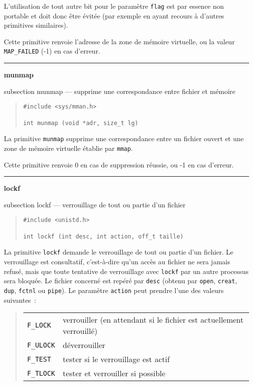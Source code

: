 \documentclass [twoside] {report}
\newcommand {\primitive} [1]
    {
	\phantomsection
	{\large \textbf {#1}}
	\addcontentsline {toc} {subsection} {#1}
    }
\newcommand {\separation}
    {
	\vspace {5mm}
	\nopagebreak
	\hrule
    }
\begin{document}
L'utilisation de tout autre bit pour le paramètre \texttt {flag} est
par essence non portable et doit donc être évitée (par exemple en
ayant recours à d'autres primitives similaires).

Cette primitive renvoie l'adresse de la zone de mémoire virtuelle, ou
la valeur \texttt {MAP\_FAILED} (-1) en cas d'erreur.


\separation
\primitive {munmap} --- supprime une correspondance entre fichier et mémoire

\begin {quote}
\begin {verbatim}
#include <sys/mman.h>

int munmap (void *adr, size_t lg)
\end{verbatim}
\end {quote}

La primitive \texttt {munmap} supprime une correspondance entre un fichier
ouvert et une zone de mémoire virtuelle établie par \texttt {mmap}.

Cette primitive renvoie 0 en cas de suppression réussie, ou -1 en
cas d'erreur.


\separation
\primitive {lockf} --- verrouillage de tout ou partie d'un fichier

\begin {quote}
\begin {verbatim}
#include <unistd.h>

int lockf (int desc, int action, off_t taille)
\end{verbatim}
\end {quote}

La primitive \texttt {lockf} demande le verrouillage de tout ou partie
d'un fichier. Le verrouillage est consultatif, c'est-à-dire qu'un
accès au fichier ne sera jamais refusé, mais que toute tentative de
verrouillage avec \texttt {lockf} par un autre processus sera bloquée.
Le fichier concerné est repéré par \texttt {desc} (obtenu par \texttt
{open}, \texttt {creat}, \texttt {dup}, \texttt {fctnl} ou \texttt {pipe}).
Le paramètre \texttt {action} peut prendre l'une des valeurs suivantes~:

\begin {quote}
    \begin {tabular} {|ll|} \hline
	\texttt {F\_LOCK} & verrouiller (en attendant si
	    le fichier est actuellement verrouillé) \\
	\texttt {F\_ULOCK} & déverrouiller \\
	\texttt {F\_TEST} & tester si le verrouillage est actif \\
	\texttt {F\_TLOCK} & tester et verrouiller si possible \\
	\hline
    \end {tabular}
\end {quote}
\end{document}
